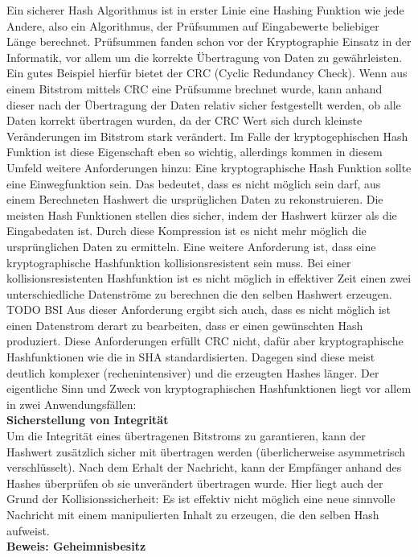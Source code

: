 \documentclass[12pt,a4paper,bibliography=totocnumbered,listof=totocnumbered]{scrartcl}
\begin{document}
Ein sicherer Hash Algorithmus ist in erster Linie eine Hashing Funktion wie jede Andere, also ein Algorithmus, der Prüfsummen auf Eingabewerte beliebiger Länge berechnet. Prüfsummen fanden schon vor der Kryptographie Einsatz in der Informatik, vor allem um die korrekte Übertragung von Daten zu gewährleisten. Ein gutes Beispiel hierfür bietet der CRC (Cyclic Redundancy Check). Wenn aus einem Bitstrom mittels CRC eine Prüfsumme brechnet wurde, kann anhand dieser nach der Übertragung der Daten relativ sicher festgestellt werden, ob alle Daten korrekt übertragen wurden, da der CRC Wert sich durch kleinste Veränderungen im Bitstrom stark verändert. Im Falle der kryptogephischen Hash Funktion ist diese Eigenschaft eben so wichtig, allerdings kommen  in diesem Umfeld weitere Anforderungen hinzu: Eine kryptographische Hash Funktion sollte eine Einwegfunktion sein. Das bedeutet, dass es nicht möglich sein darf, aus einem Berechneten Hashwert die ursprüglichen Daten zu rekonstruieren. Die meisten Hash Funktionen stellen dies sicher, indem der Hashwert kürzer als die Eingabedaten ist. Durch diese Kompression ist es nicht mehr möglich die ursprünglichen Daten zu ermitteln. Eine weitere Anforderung ist, dass eine kryptographische Hashfunktion kollisionsresistent sein muss. Bei einer kollisionsresistenten Hashfunktion ist es nicht möglich in effektiver Zeit einen zwei unterschiedliche Datenströme zu berechnen die den selben Hashwert erzeugen. TODO BSI Aus dieser Anforderung ergibt sich auch, dass es nicht möglich ist einen Datenstrom derart zu bearbeiten, dass er einen gewünschten Hash produziert. Diese Anforderungen erfüllt CRC nicht, dafür aber kryptographische Hashfunktionen wie die in SHA standardisierten. Dagegen sind diese meist deutlich komplexer (rechenintensiver) und die erzeugten Hashes länger. Der eigentliche Sinn und Zweck von kryptographischen Hashfunktionen liegt vor allem in zwei Anwendungsfällen:
\\\textbf{Sicherstellung von Integrität}\\
Um die Integrität eines übertragenen Bitstroms zu garantieren, kann der Hashwert zusätzlich sicher mit übertragen werden (überlicherweise asymmetrisch verschlüsselt). Nach dem Erhalt der Nachricht, kann der Empfänger anhand des Hashes überprüfen ob sie unverändert übertragen wurde. Hier liegt auch der Grund der Kollisionssicherheit: Es ist effektiv nicht möglich eine neue sinnvolle Nachricht mit einem manipulierten Inhalt zu erzeugen, die den selben Hash aufweist.
\\\textbf{Beweis: Geheimnisbesitz}\\\label{KryptV}
\end{document}
